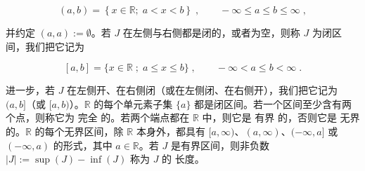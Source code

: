 \[
(a,b)=\left\{x\in\mathbb{R};\;a<x<b\right\}\;,\qquad-\infty\leq a\leq b\leq\infty\;,
\]

并约定 $ (a,a):=\emptyset $。若 $ J $ 在左侧与右侧都是闭的，或者为空，则称 $ J $ 为闭区间，我们把它记为

\[
[a,b]=\{x\in\mathbb{R}\;;\;a\leq x\leq b\}\;,\qquad-\infty<a\leq b<\infty\;.
\]

进一步，若 $ J $ 在左侧开、在右侧闭（或在左侧闭、在右侧开），我们把它记为 $ (a,b] $（或 $ [a,b) $）。$ \mathbb{R} $ 的每个单元素子集 $ \{a\} $ 都是闭区间。若一个区间至少含有两个点，则称它为 $ \text{完全} $ 的。若两个端点都在 $ \mathbb{R} $ 中，则它是 $ \text{有界} $ 的，否则它是 $ \text{无界} $ 的。$ \mathbb{R} $ 的每个无界区间，除 $ \mathbb{R} $ 本身外，都具有 $ [a,\infty) $、$ (a,\infty) $、$ (-\infty,a] $ 或 $ (-\infty,a) $ 的形式，其中 $ a\in\mathbb{R} $。若 $ J $ 是有界区间，则非负数 $ |J|:=\sup(J)-\inf(J) $ 称为 $ J $ 的 $ \text{长度} $。

\exerciseshead

